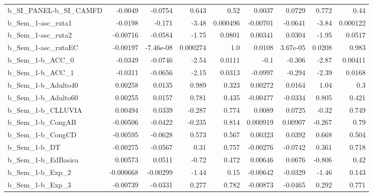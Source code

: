 \begin{tabular}{lrrrrrrrr}
b\_SI\_PANEL-b\_SI\_CAMFD      &     -0.0049 &      -0.0754 &     0.643 &     0.52 &     0.0037 &      0.0729 &        0.772 &          0.44 \\
b\_Sem\_1-asc\_ruta1          &     -0.0198 &       -0.171 &     -3.48 & 0.000496 &   -0.00701 &     -0.0641 &        -3.84 &      0.000122 \\
b\_Sem\_1-asc\_ruta2          &    -0.00716 &      -0.0584 &     -1.75 &   0.0801 &    0.00341 &      0.0304 &        -1.95 &        0.0517 \\
b\_Sem\_1-asc\_rutaEC         &    -0.00197 &    -7.46e-08 &  0.000274 &      1.0 &     0.0108 &    3.67e-05 &       0.0208 &         0.983 \\
b\_Sem\_1-b\_ACC\_0            &     -0.0349 &      -0.0746 &     -2.54 &   0.0111 &       -0.1 &      -0.306 &        -2.87 &       0.00411 \\
b\_Sem\_1-b\_ACC\_1            &     -0.0311 &      -0.0656 &     -2.15 &   0.0313 &    -0.0997 &      -0.294 &        -2.39 &        0.0168 \\
b\_Sem\_1-b\_Adulto40         &     0.00258 &       0.0135 &     0.989 &    0.323 &    0.00272 &      0.0164 &         1.04 &           0.3 \\
b\_Sem\_1-b\_Adulto60         &     0.00255 &       0.0157 &     0.781 &    0.435 &   -0.00477 &     -0.0334 &        0.805 &         0.421 \\
b\_Sem\_1-b\_CLLUVIA          &     0.00494 &       0.0339 &    -0.287 &    0.774 &     0.0089 &      0.0725 &        -0.32 &         0.749 \\
b\_Sem\_1-b\_CongAB           &    -0.00506 &      -0.0422 &    -0.235 &    0.814 &   0.000919 &     0.00907 &       -0.267 &          0.79 \\
b\_Sem\_1-b\_CongCD           &    -0.00595 &      -0.0628 &     0.573 &    0.567 &    0.00323 &      0.0392 &        0.668 &         0.504 \\
b\_Sem\_1-b\_DT               &    -0.00275 &      -0.0567 &      0.31 &    0.757 &   -0.00276 &     -0.0742 &        0.361 &         0.718 \\
b\_Sem\_1-b\_EdBasica         &     0.00573 &       0.0511 &     -0.72 &    0.472 &    0.00646 &      0.0676 &       -0.806 &          0.42 \\
b\_Sem\_1-b\_Exp\_2            &   -0.000668 &     -0.00299 &     -1.44 &     0.15 &   -0.00642 &     -0.0329 &        -1.46 &         0.143 \\
b\_Sem\_1-b\_Exp\_3            &    -0.00739 &      -0.0331 &     0.277 &    0.782 &   -0.00873 &     -0.0465 &        0.292 &         0.771 \\

\end{tabular}
